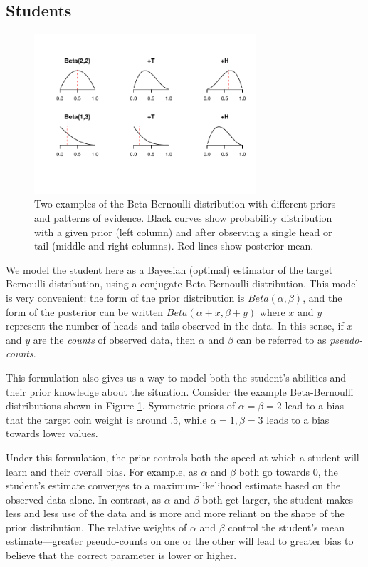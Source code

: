 \documentclass[10pt,letterpaper]{article}
\begin{document}
\subsection{Students}

\begin{figure}[t]
\begin{center}
\includegraphics[width=3.25in]{figures/students2.pdf}
\end{center}
\caption{\label{fig:students} Two examples of the Beta-Bernoulli distribution with different priors and patterns of evidence. Black curves show probability distribution with a given prior (left column) and after observing a single head or tail (middle and right columns). Red lines show posterior mean.}
\end{figure}

We model the student here as a Bayesian (optimal) estimator of the target Bernoulli distribution, using a conjugate Beta-Bernoulli distribution. This model is very convenient: the form of the prior distribution is $Beta(\alpha,\beta)$, and the form of the posterior can be written $Beta(\alpha+x,\beta+y)$ where $x$ and $y$ represent the number of heads and tails observed in the data. In this sense, if $x$ and $y$ are the \emph{counts} of observed data, then $\alpha$ and $\beta$ can be referred to as \emph{pseudo-counts}.

This formulation also gives us a way to model both the student's abilities and their prior knowledge about the situation. Consider the example Beta-Bernoulli distributions shown in Figure \ref{fig:students}. Symmetric priors of $\alpha=\beta=2$ lead to a bias that the target coin weight is around .5, while $\alpha=1, \beta=3$ leads to a bias towards lower values. 

Under this formulation, the prior controls both the speed at which a student will learn and their overall bias. For example, as $\alpha$ and $\beta$ both go towards 0, the student's estimate converges to a maximum-likelihood estimate based on the observed data alone. In contrast, as $\alpha$ and $\beta$ both get larger, the student makes less and less use of the data and is more and more reliant on the shape of the prior distribution. The relative weights of $\alpha$ and $\beta$ control the student's mean estimate---greater pseudo-counts on one or the other will lead to greater bias to believe that the correct parameter is lower or higher. 
\end{document}
